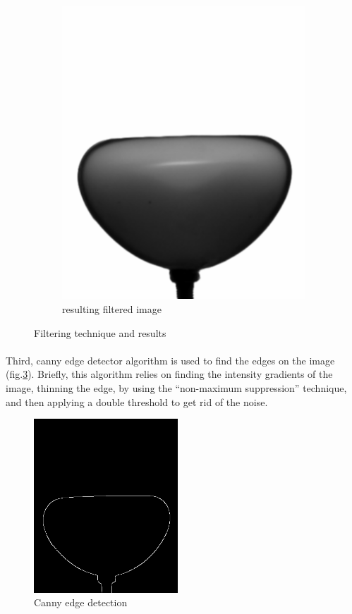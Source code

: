 \begin{figure}[H]
		\begin{subfigure}[h]{0.48\textwidth}%
        \includegraphics[width=\linewidth]{figures/Chapter_1/resulting_f.png}%
        \caption{resulting filtered image}%
				\label{fig:resulting_f}%
    \end{subfigure}%
		\caption{Filtering technique and results}%
		\label{fig:filtering_image_treatment}%
\end{figure}
\paragraph{}
Third, canny edge detector algorithm\cite{canny} is used to find the edges on the image (fig.\ref{fig:canny}). Briefly, this algorithm relies on finding the intensity gradients of the image, thinning the edge, by using the "`non-maximum suppression"' technique, and then applying a double threshold to get rid of the noise.
\begin{figure}[H] %
	\centering%
  \includegraphics[width=0.48\textwidth]{figures/Chapter_1/canny.png}
	\caption{Canny edge detection}
	\label{fig:canny}
\end{figure}
